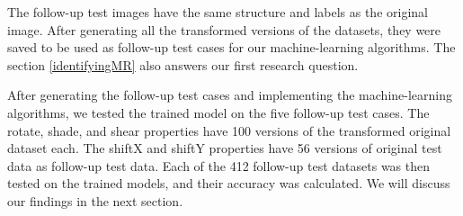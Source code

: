 The follow-up test images have the same structure and labels as the original image. After generating all the transformed versions of the datasets, they were saved to be used as follow-up test cases for our machine-learning algorithms. The section \ref{identifyingMR} also answers our first research question.

After generating the follow-up test cases and implementing the machine-learning algorithms, we tested the trained model on the five follow-up test cases. The rotate, shade, and shear properties have 100 versions of the transformed original dataset each. The shiftX and shiftY properties have 56 versions of original test data as follow-up test data. Each of the 412 follow-up test datasets was then tested on the trained models, and their accuracy was calculated. We will discuss our findings in the next section.